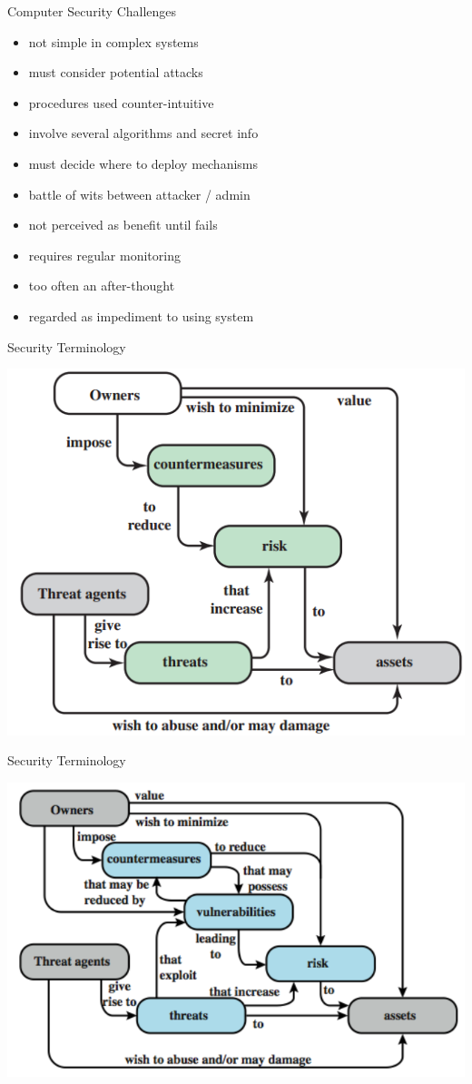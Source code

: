 \documentclass{beamer}
\begin{document}
\begin{frame}{Computer Security Challenges}
  \begin{itemize}
\item not simple in complex systems 
\item must consider potential attacks 
\item procedures used counter-intuitive 
\item involve several algorithms and secret info 
\item must decide where to deploy mechanisms 
\item battle of wits between attacker / admin 
\item not perceived as benefit until fails 
\item requires regular monitoring 
\item too often an after-thought 
\item regarded as impediment to using system
  \end{itemize}
\end{frame}


\begin{frame}{Security Terminology}
  \begin{center}
    \includegraphics[width=0.7\linewidth]{terminology}
  \end{center}
\end{frame}

\begin{frame}{Security Terminology}
  \begin{center}
    \includegraphics[width=0.7\linewidth]{terminology2}
  \end{center}
\end{frame}
\end{document}
